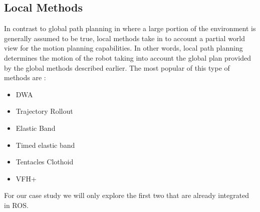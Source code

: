 \subsection{Local Methods}
In contrast to global path planning in where a large portion of the environment is generally assumed to be true, local methods take in to account a partial world view for the motion planning capabilities. In other words, local path planning determines the motion of the robot taking into account the global plan provided by the global methods described earlier.
The most popular of this type of methods are \cite{inbookdwa}:
\begin{itemize}
    \item \ac{DWA} \cite{foxdwa}
    \item Trajectory Rollout  \cite{gerkey2008planning}
    \item Elastic Band \cite{siegwart2011introduction}
    \item Timed elastic band \cite{rosmann2013efficient}
    \item Tentacles Clothoid \cite{ffalia2015local}
    \item \ac{VFH}+ \cite{siegwart2011introduction}
\end{itemize}
For our case study we will only explore the first two that are already integrated in ROS.
